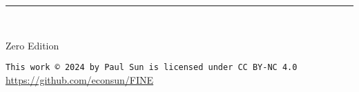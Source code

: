\documentclass[../Main.tex]{subfiles}
\begin{document}
\begin{titlepage}
\begin{flushleft}

\textbf{\selectfont\Huge \BigTitle}

\par\noindent\rule{\textwidth}{4pt}\\


\begin{flushright}
\Large Zero Edition
\end{flushright}

\vspace{\fill}

\begin{center}
    \texttt{This work © 2024 by Paul Sun is licensed under CC BY-NC 4.0} \\
    \url{https://github.com/econsun/FINE}
\end{center}

\end{flushleft}
\end{titlepage}

\restoregeometry
\end{document}
